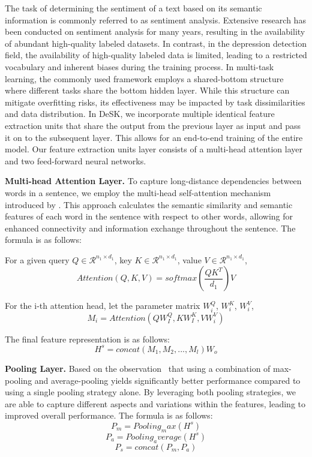 \documentclass[runningheads]{llncs}
\begin{document}
The task of determining the sentiment of a text based on its semantic information is commonly referred to as sentiment analysis. Extensive research has been conducted on sentiment analysis for many years, resulting in the availability of abundant high-quality labeled datasets. In contrast, in the depression detection field, the availability of high-quality labeled data is limited, leading to a restricted vocabulary and inherent biases during the training process. In multi-task learning, the commonly used framework employs a shared-bottom structure where different tasks share the bottom hidden layer. While this structure can mitigate overfitting risks, its effectiveness may be impacted by task dissimilarities and data distribution. In DeSK, we incorporate multiple identical feature extraction units that share the output from the previous layer as input and pass it on to the subsequent layer. This allows for an end-to-end training of the entire model. Our feature extraction units layer consists of a multi-head attention layer and two feed-forward neural networks.

\textbf{Multi-head Attention Layer.} To capture long-distance dependencies between words in a sentence, we employ the multi-head self-attention mechanism introduced by \cite{vaswani2017attention}. This approach calculates the semantic similarity and semantic features of each word in the sentence with respect to other words, allowing for enhanced connectivity and information exchange throughout the sentence. The formula is as follows:

For a given query $Q\in\mathcal{R}^{n_1 \times d_1}$, key $K\in\mathcal{R}^{n_1 \times d_1}$, value $V\in\mathcal{R}^{n_1 \times d_1}$,$$Attention(Q,K,V) = softmax(\frac{QK^T}{d_1})V$$

For the i-th attention head, let the parameter matrix $W^Q_i$, $W^K_i$, $W^V_i$, $$M_i = Attention(QW^Q_I, KW^K_I, VW^V_i)$$ 

The final feature representation is as follows:
$$H^s = concat(M_1, M_2,...,M_l)W_o$$

\textbf{Pooling Layer.} Based on the observation~\cite{shen2018use} that using a combination of max-pooling and average-pooling yields significantly better performance compared to using a single pooling strategy alone. By leveraging both pooling strategies, we are able to capture different aspects and variations within the features, leading to improved overall performance. The formula is as follows: 
$$P_m = Pooling_max(H^s)$$
$$P_a = Pooling_average(H^s)$$
$$P_s = concat(P_m, P_a)$$
\end{document}
